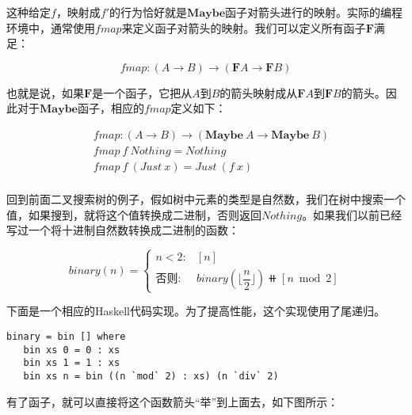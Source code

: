 \documentclass{article}
\begin{document}
\begin{example}
这种给定$f$，映射成$f'$的行为恰好就是$\mathbf{Maybe}$函子对箭头进行的映射。实际的编程环境中，通常使用$fmap$来定义函子对箭头的映射。我们可以定义所有函子$\mathbf{F}$满足：

\[
fmap : (A \to B) \to (\mathbf{F} A \to \mathbf{F} B)
\]

也就是说，如果$\mathbf{F}$是一个函子，它把从$A$到$B$的箭头映射成从$\mathbf{F} A$到$\mathbf{F} B$的箭头。因此对于$\mathbf{Maybe}$函子，相应的$fmap$定义如下：

\[
\begin{array}{l}
\quad    fmap : (A \to B) \to (\mathbf{Maybe}\ A \to \mathbf{Maybe}\ B) \\
\quad    fmap\ f\ Nothing = Nothing \\
\quad    fmap\ f\ (Just\ x) = Just\ (f\ x) \\
\end{array}
\]

回到前面二叉搜索树的例子，假如树中元素的类型是自然数，我们在树中搜索一个值，如果搜到，就将这个值转换成二进制，否则返回$Nothing$。如果我们以前已经写过一个将十进制自然数转换成二进制的函数：

\[
binary(n) = \begin{cases}
n < 2: & [n] \\
\text{否则}: & binary(\lfloor\dfrac{n}{2}\rfloor)\doubleplus[n \bmod 2]
\end{cases}
\]

下面是一个相应的Haskell代码实现。为了提高性能，这个实现使用了尾递归。

\lstset{frame=single}
\begin{lstlisting}[style=Haskell]
binary = bin [] where
   bin xs 0 = 0 : xs
   bin xs 1 = 1 : xs
   bin xs n = bin ((n `mod` 2) : xs) (n `div` 2)
\end{lstlisting}

有了函子，就可以直接将这个函数箭头“举”到上面去，如下图所示：

\begin{center}
\end{center}


\end{example}
\end{document}
